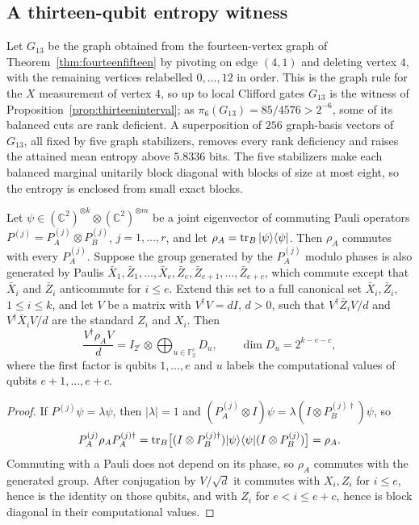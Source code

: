 \subsection{A thirteen-qubit entropy witness}
\label{sec:thirteen-entropy-witness}

Let $G_{13}$ be the graph obtained from the fourteen-vertex graph of
Theorem~\ref{thm:fourteenfifteen} by pivoting on edge $(4,1)$ and
deleting vertex $4$, with the remaining vertices relabelled
$0,\ldots,12$ in order. This is the graph rule for the $X$ measurement
of vertex $4$, so up to local Clifford gates $G_{13}$ is the witness
of Proposition~\ref{prop:thirteeninterval}; as
$\pi_6(G_{13})=85/4576>2^{-6}$, some of its balanced cuts are rank
deficient. A superposition of
$256$ graph-basis vectors of $G_{13}$, all fixed by five graph
stabilizers, removes every rank deficiency and raises the attained
mean entropy above $5.8336$ bits. The five stabilizers make each
balanced marginal unitarily block diagonal with blocks of size at most
eight, so the entropy is enclosed from small exact blocks.

\begin{lemma}
\label{lem:pauli-code-compression}
Let $\psi\in(\mathbb C^2)^{\otimes k}\otimes(\mathbb C^2)^{\otimes m}$
be a joint eigenvector of commuting Pauli operators
$P^{(j)}=P_A^{(j)}\otimes P_B^{(j)}$, $j=1,\ldots,r$, and let
$\rho_A=\operatorname{tr}_B|\psi\rangle\langle\psi|$. Then $\rho_A$ commutes
with every $P_A^{(j)}$. Suppose the group generated by the
$P_A^{(j)}$ modulo phases is also generated by Paulis
$\bar X_1,\bar Z_1,\ldots,\bar X_e,\bar Z_e,\bar Z_{e+1},\ldots,\bar Z_{e+c}$,
which commute except that $\bar X_i$ and $\bar Z_i$ anticommute for
$i\le e$. Extend this set to a full canonical set
$\bar X_i,\bar Z_i$, $1\le i\le k$, and let $V$ be a matrix with
$V^\dagger V=dI$, $d>0$, such that $V^\dagger\bar Z_iV/d$ and
$V^\dagger\bar X_iV/d$ are the standard $Z_i$ and $X_i$. Then
\[
 \frac{V^\dagger\rho_AV}{d}
 =I_{2^e}\otimes\bigoplus_{u\in\mathbb F_2^c}D_u,
 \qquad \dim D_u=2^{k-e-c},
\]
where the first factor is qubits $1,\ldots,e$ and $u$ labels the
computational values of qubits $e+1,\ldots,e+c$.
\end{lemma}
\begin{proof}
If $P^{(j)}\psi=\lambda\psi$, then $|\lambda|=1$ and
$(P_A^{(j)}\otimes I)\psi=\lambda(I\otimes P_B^{(j)\dagger})\psi$, so
\[
 P_A^{(j)}\rho_AP_A^{(j)\dagger}
 =\operatorname{tr}_B\bigl[(I\otimes P_B^{(j)\dagger})|\psi\rangle\langle\psi|
             (I\otimes P_B^{(j)})\bigr]=\rho_A.
\]
Commuting with a Pauli does not depend on its phase, so $\rho_A$
commutes with the generated group. After conjugation by $V/\sqrt d$
it commutes with $X_i,Z_i$ for $i\le e$, hence is the identity on
those qubits, and with $Z_i$ for $e<i\le e+c$, hence is block
diagonal in their computational values.
\end{proof}

